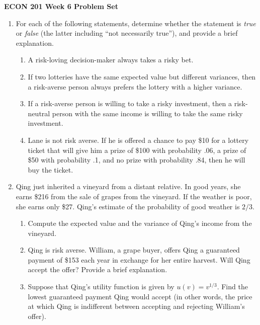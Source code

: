 \documentclass[11pt]{article}
\begin{document}
\begin{center}
\textbf{ECON 201 Week 6 Problem Set}
\end{center}

\begin{enumerate}
\item For each of the following statements, determine whether
the statement is \emph{true} or \emph{false} (the latter including ``not necessarily true''), and provide a brief explanation.

    \begin{enumerate}
   	\item A risk-loving decision-maker always takes a risky bet.
	
	\item If two lotteries have the same expected value but different variances, then a risk-averse person always prefers the lottery with a higher variance.

    \item If a risk-averse person is willing to take a risky investment, then a risk-neutral person with the same income is willing to take the same risky investment.

    \item Lane is not risk averse. If he is offered a chance to pay \$10 for a lottery ticket that will give him a prize of \$100 with probability .06, a prize of \$50 with probability .1, and no prize with probability .84, then he will buy the ticket.

    \end{enumerate}

\item Qing just inherited a vineyard from a distant relative. In good years, she earns \$216 from the sale of grapes from the vineyard. If the weather is poor, she earns only \$27. Qing's estimate of the probability of good weather is $2/3$.
	\begin{enumerate}
	\item Compute the expected value and the variance of Qing's income from the vineyard.
	
	\item Qing is risk averse. William, a grape buyer, offers Qing a guaranteed payment of \$153 each year in exchange for her entire harvest. Will Qing accept the offer? Provide a brief explanation.
	
	\item Suppose that Qing's utility function is given by $u(v)=v^{1/3}$. Find the lowest guaranteed payment Qing would accept (in other words, the price at which Qing is indifferent between accepting and rejecting William's offer).
    \end{enumerate}


\end{enumerate}
\end{document}
